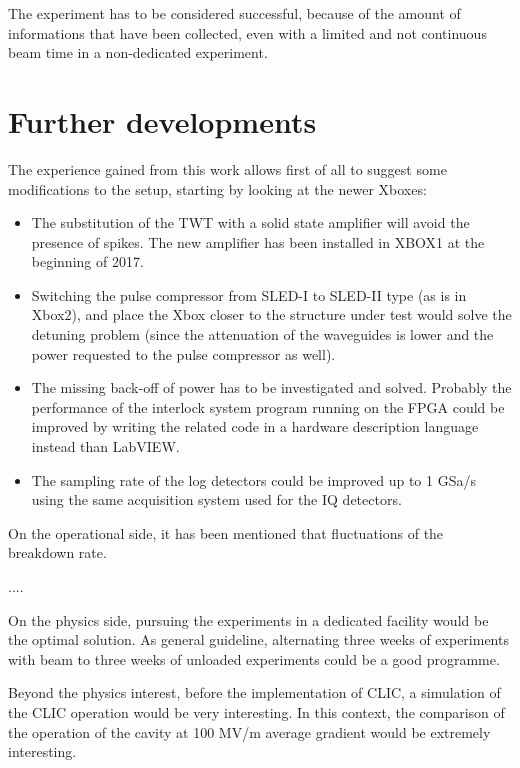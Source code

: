 The experiment has to be considered successful, because of the amount of informations that have been collected, even with a limited and not continuous beam time in a non-dedicated experiment.



\section[Further developments]{Further developments}

The experience gained from this work allows first of all to suggest some modifications to the setup, starting by looking at the newer Xboxes:
\begin{itemize}
\item The substitution of the TWT with a solid state amplifier will avoid the presence of spikes. The new amplifier has been installed in XBOX1 at the beginning of 2017.
\item Switching the pulse compressor from SLED-I to SLED-II type (as is in Xbox2), and place the Xbox closer to the structure under test would solve the detuning problem (since the attenuation of the waveguides is lower and the power requested to the pulse compressor as well).
\item The missing back-off of power has to be investigated and solved. Probably the performance of the interlock system program running on the FPGA could be improved by writing the related code in a hardware description language instead than LabVIEW.
\item The sampling rate of the log detectors could be improved up to 1 GSa/s using the same acquisition system used for the IQ detectors.
\end{itemize}

On the operational side, it has been mentioned that fluctuations of the breakdown rate.


....


On the physics side, pursuing the experiments in a dedicated facility would be the optimal solution. As general guideline, alternating three weeks of experiments with beam to three weeks of unloaded experiments could be a good programme.

Beyond the physics interest, before the implementation of CLIC, a simulation of the CLIC operation would be very interesting. In this context, the comparison of the operation of the cavity at 100 MV/m average gradient would be extremely interesting.













